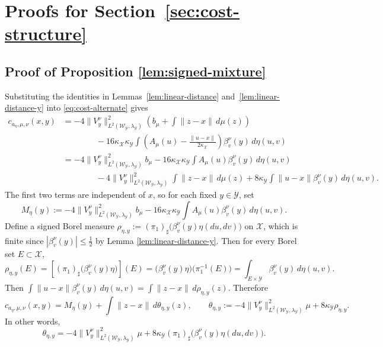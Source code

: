 \documentclass[11pt]{amsart}
\theoremstyle{definition}
\theoremstyle{remark}
\newcommand{\1}{\mathbf{1}}
\numberwithin{equation}{section}
\begin{document}
\section{Proofs for Section~\ref{sec:cost-structure}}\label{sec:duality-cost-proofs}

\subsection{Proof of Proposition \ref{lem:signed-mixture}}
\label{pf:signed-mixture}
Substituting the identities in Lemmas~\ref{lem:linear-distance} and~\ref{lem:linear-distance-y} into \eqref{eq:cost-alternate} gives
\begin{align*}
c_{a_\eta,\mu,\nu}(x,y)
&=
-4\|V_y^\nu\|^2_{L^2(\mathcal W_\mathcal Y,\lambda_\mathcal Y)}
\left(
b_\mu+\int \|z-x\|\,d\mu(z)
\right)  \\
&\qquad \qquad
-
16\kappa_{\mathcal X}\kappa_{\mathcal Y}
\int
\left(
A_\mu(u)-\frac{\|u-x\|}{2\kappa_{\mathcal X}}
\right)
\beta_v^\nu(y)\,d\eta(u,v) \\
&=
-4\|V_y^\nu\|^2_{L^2(\mathcal W_\mathcal Y,\lambda_\mathcal Y)}b_\mu
-
16\kappa_{\mathcal X}\kappa_{\mathcal Y}
\int A_\mu(u)\beta_v^\nu(y)\,d\eta(u,v)
\\
&\qquad \qquad
-4\|V_y^\nu\|^2_{L^2(\mathcal W_\mathcal Y,\lambda_\mathcal Y)}
\int \|z-x\|\,d\mu(z)
+
8\kappa_{\mathcal Y}
\int\|u-x\|\beta_v^\nu(y)\,d\eta(u,v).
\end{align*}
The first two terms are independent of $x$, so for each fixed $y\in \mathcal Y$, set
\[
M_\eta(y)
:=
-4\|V_y^\nu\|^2_{L^2(\mathcal W_\mathcal Y,\lambda_\mathcal Y)}b_\mu
-
16\kappa_{\mathcal X}\kappa_{\mathcal Y}
\int A_\mu(u)\beta_v^\nu(y)\,d\eta(u,v).
\]
Define a signed Borel measure
$\rho_{\eta,y} := (\pi_1)_\sharp\bigl(\beta_v^\nu(y)\eta(du,dv)\bigr)$
on $\mathcal X$, which is finite since $|\beta_v^\nu(y)|\le \frac12$ by Lemma \ref{lem:linear-distance-y}. Then for every Borel set $E\subset \mathcal X$,
\[
\rho_{\eta,y}(E)
=
\left[(\pi_1)_\sharp\bigl(\beta_v^\nu(y)\eta\bigr)\right](E)
=
\bigl(\beta_v^\nu(y)\eta\bigr)\bigl(\pi_1^{-1}(E)\bigr)
=
\int_{E\times \mathcal Y} \beta_v^\nu(y)\,d\eta(u,v).
\]
Then
$\int\|u-x\|\beta_v^\nu(y)\,d\eta(u,v) = \int \|z-x\|\,d\rho_{\eta,y}(z).$
Therefore
\[
c_{a_\eta,\mu,\nu}(x,y)
=
M_\eta(y)
+
\int \|z-x\|\,d\theta_{\eta,y}(z), \qquad 
\theta_{\eta,y}
:=
-4\|V_y^\nu\|^2_{L^2(\mathcal W_\mathcal Y,\lambda_\mathcal Y)}\mu
+
8\kappa_{\mathcal Y}\rho_{\eta,y}.
\]
In other words,
\[
\theta_{\eta,y}
=
-4\|V_y^\nu\|^2_{L^2(\mathcal W_\mathcal Y,\lambda_\mathcal Y)}\mu
+
8\kappa_{\mathcal Y}(\pi_1)_\sharp\bigl(\beta_v^\nu(y)\eta(du,dv)\bigr).
\]
\end{document}
